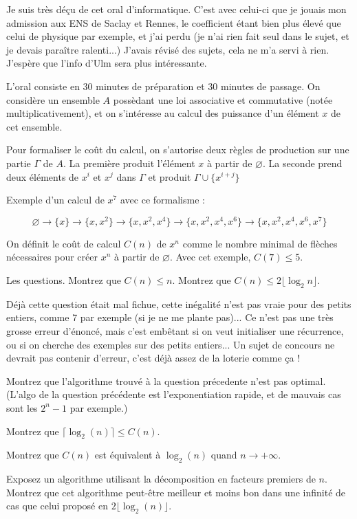 \documentclass[french,a4paper, 12pt]{article}
\begin{document}
Je suis très déçu de cet oral d'informatique. C'est avec celui-ci que je jouais mon admission aux ENS de Saclay et Rennes, le coefficient étant bien plus élevé que celui de physique par exemple, et j'ai perdu (je n'ai rien fait seul dans le sujet, et je devais paraître ralenti...) J'avais révisé des sujets, cela ne m'a servi à rien. J'espère que l'info d'Ulm sera plus intéressante.

L'oral consiste en 30 minutes de préparation et 30 minutes de passage. On considère un ensemble $A$ possèdant une loi associative et commutative (notée multiplicativement), et on s'intéresse au calcul des puissance d'un élément $x$ de cet ensemble.

Pour formaliser le coût du calcul, on s'autorise deux règles de production sur une partie $\Gamma$ de $A$. La première produit l'élément $x$ à partir de $\varnothing$. La seconde prend deux éléments de $x^i$ et $x^j$ dans $\Gamma$ et produit $\Gamma \cup \{x^{i+j}\}$

Exemple d'un calcul de $x^7$ avec ce formalisme :

$$\varnothing \longrightarrow \{x\}\longrightarrow \{x, x^2\} \longrightarrow \{x, x^2, x^4\}\longrightarrow \{x, x^2, x^4, x^6\}\longrightarrow \{x, x^2, x^4, x^6, x^7\}$$

On définit le coût de calcul $C(n)$ de $x^n$ comme le nombre minimal de flèches nécessaires pour créer $x^n$ à partir de $\varnothing$. Avec cet exemple, $C(7) \le 5$.

Les questions. Montrez que $C(n) \le n$. Montrez que $C(n) \le 2\lfloor \log_2{n}  \rfloor$.

Déjà cette question était mal fichue, cette inégalité n'est pas vraie pour des petits entiers, comme 7 par exemple (si je ne me plante pas)... Ce n'est pas une très grosse erreur d'énoncé, mais c'est embêtant si on veut initialiser une récurrence, ou si on cherche des exemples sur des petits entiers... Un sujet de concours ne devrait pas contenir d'erreur, c'est déjà assez de la loterie comme ça !

Montrez que l'algorithme trouvé à la question précedente n'est pas optimal. (L'algo de la question précédente est l'exponentiation rapide, et de mauvais cas sont les $2^n-1$ par exemple.)

Montrez que $\lceil \log_2(n)\rceil \le C(n)$.

Montrez que $C(n)$ est équivalent à $\log_2(n)$ quand $n\rightarrow +\infty$.

Exposez un algorithme utilisant la décomposition en facteurs premiers de $n$. Montrez que cet algorithme peut-être meilleur et moins bon dans une infinité de cas que celui proposé en $2\lfloor \log_2(n) \rfloor$.
\end{document}
